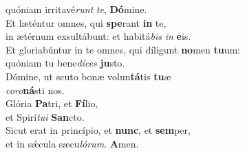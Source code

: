 \evenverse quóniam irritavé\textit{runt} \textit{te}, \textbf{Dó}mine.\\
\oddverse Et læténtur omnes, qui \textbf{spe}rant \textbf{in} te,~\*\\
\oddverse in ætérnum exsultábunt: et habitá\textit{bis} \textit{in} \textbf{e}is.\\
\evenverse Et gloriabúntur in te omnes, qui díligunt \textbf{no}men \textbf{tu}um:~\*\\
\evenverse quóniam tu bene\textit{dí}\textit{ces} \textbf{ju}sto.\\
\oddverse Dómine, ut scuto bonæ volun\textbf{tá}tis \textbf{tu}æ~\*\\
\oddverse \textit{co}\textit{ro}\textbf{ná}sti nos.\\
\evenverse Glória \textbf{Pa}tri, et \textbf{Fí}lio,~\*\\
\evenverse et Spirí\textit{tu}\textit{i} \textbf{San}cto.\\
\oddverse Sicut erat in princípio, et \textbf{nunc}, et \textbf{sem}per,~\*\\
\oddverse et in sǽcula sæcu\textit{ló}\textit{rum}. \textbf{A}men.\\
